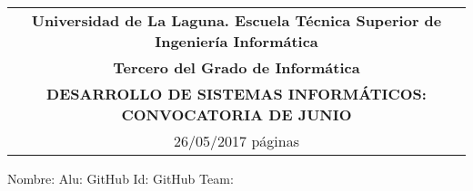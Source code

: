 \documentclass[]{article}
\date{}
\begin{document}
\thispagestyle{empty}
  \begin{tabular}{c}
   {\bf Universidad de La Laguna.  Escuela Técnica Superior de Ingeniería Informática}     \\
   {\bf Tercero del Grado de Informática}\\
   {\bf DESARROLLO DE SISTEMAS INFORMÁTICOS: CONVOCATORIA DE JUNIO}\\
   26/05/2017  \pageref*{LastPage} páginas         \\   
  \end{tabular}                     %

\bigskip

Nombre:  \underline{\hspace{10.5cm}} 
Alu: \underline{\hspace{2cm}} 
GitHub Id: \underline{\hspace{2cm}} 
GitHub Team: \underline{\hspace{2cm}} 
\bigskip

\end{document}
